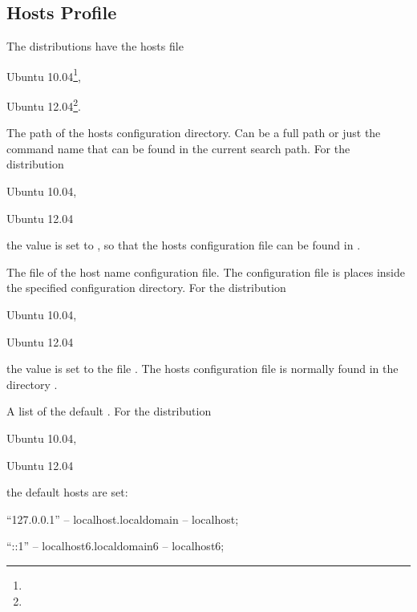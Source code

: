 \subsection{Hosts Profile}

The distributions have the hosts file
\begin{compactitem}
\item[\TheDistribution{ubuntu}] Ubuntu 10.04\footnote{\TheUbuntuMaverickLTSDate},
\item[\TheDistribution{ubuntu}] Ubuntu 12.04\footnote{\TheUbuntuPreciseLTSDate}.
\end{compactitem}


The path of the hosts configuration directory. Can be a full path or
just the command name that can be found in the current search path.
For the distribution
\begin{inparaitem}
\item[\TheDistribution{ubuntu}] Ubuntu 10.04,
\item[\TheDistribution{ubuntu}] Ubuntu 12.04
\end{inparaitem}
the value is set to , so that the hosts configuration
file can be found in .


The file  of the host name configuration file. The configuration file
is places inside the specified configuration directory.
For the distribution
\begin{inparaitem}
\item[\TheDistribution{ubuntu}] Ubuntu 10.04,
\item[\TheDistribution{ubuntu}] Ubuntu 12.04
\end{inparaitem}
the value is set to the file . The hosts configuration
file is normally found in the directory .


A list of the default .
For the distribution
\begin{inparaitem}
\item[\TheDistribution{ubuntu}] Ubuntu 10.04,
\item[\TheDistribution{ubuntu}] Ubuntu 12.04
\end{inparaitem}
the default hosts are set:
\begin{compactitem}
\item ``127.0.0.1'' -- localhost.localdomain -- localhost;
\item ``::1'' -- localhost6.localdomain6 -- localhost6;
\end{compactitem}

